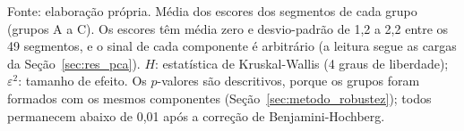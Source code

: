 \begin{table}[htbp]
\centering
\caption{Escore médio dos componentes por grupo e teste de Kruskal-Wallis entre grupos}
\label{tab:escores}
\par\footnotesize Fonte: elaboração própria. Média dos escores dos segmentos de cada grupo (grupos A a C). Os escores têm média zero e desvio-padrão de 1,2 a 2,2 entre os 49 segmentos, e o sinal de cada componente é arbitrário (a leitura segue as cargas da Seção~\ref{sec:res_pca}). $H$: estatística de Kruskal-Wallis (4 graus de liberdade); $\varepsilon^2$: tamanho de efeito. Os $p$-valores são descritivos, porque os grupos foram formados com os mesmos componentes (Seção~\ref{sec:metodo_robustez}); todos permanecem abaixo de 0,01 após a correção de Benjamini-Hochberg.
\end{table}
